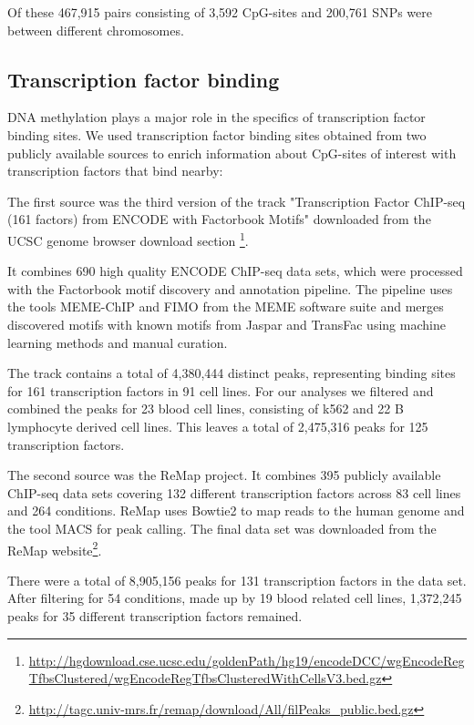 \documentclass[a4paper,12pt,twoside,openright]{article}
\begin{document}
Of these 467,915 pairs consisting of 3,592 CpG-sites and 200,761 SNPs were between different chromosomes. 


\subsection{Transcription factor binding}
\label{Data:tfbs}
DNA methylation plays a major role in the specifics of transcription factor binding sites\cite{Yineaaj2239}. We used transcription factor binding sites obtained from two publicly available sources to enrich information about CpG-sites of interest with transcription factors that bind nearby: 

The first source was the third version of the track "Transcription Factor ChIP-seq (161 factors) from ENCODE with Factorbook Motifs"\cite{10.1101/gr.139105.112} downloaded from the UCSC genome browser download section \footnote{\url{http://hgdownload.cse.ucsc.edu/goldenPath/hg19/encodeDCC/wgEncodeRegTfbsClustered/wgEncodeRegTfbsClusteredWithCellsV3.bed.gz}}.

It combines 690 high quality ENCODE ChIP-seq data sets, which were processed with the Factorbook motif discovery and annotation pipeline\cite{10.1101/gr.139105.112}. The pipeline uses the tools MEME-ChIP\cite{10.1093/bioinformatics/btr189} and FIMO\cite{10.1093/bioinformatics/btr064} from the MEME software suite and merges discovered motifs with known motifs from Jaspar\cite{10.1093/nar/gkx1126} and TransFac\cite{10.1093/nar/gkj143} using machine learning methods and manual curation. 

The track contains a total of 4,380,444 distinct peaks, representing binding sites for 161 transcription factors in 91 cell lines. For our analyses we filtered and combined the peaks for 23 blood cell lines, consisting of k562 and 22  B lymphocyte derived cell lines. This leaves a total of 2,475,316 peaks for 125 transcription factors.  

The second source was the ReMap project\cite{10.1093/nar/gku1280}. It combines 395 publicly available ChIP-seq data sets covering 132 different transcription factors across 83 cell lines and 264 conditions. ReMap uses Bowtie2\cite{10.1038/nmeth.1923} to map reads to the human genome and the tool MACS\cite{10.1186/gb-2008-9-9-r137} for peak calling. The final data set was downloaded from the ReMap website\footnote{\url{http://tagc.univ-mrs.fr/remap/download/All/filPeaks_public.bed.gz}}.

There were a total of 8,905,156 peaks for 131 transcription factors in the data set. After filtering for 54 conditions, made up by 19 blood related cell lines,  1,372,245 peaks for 35 different transcription factors remained.  
\end{document}
